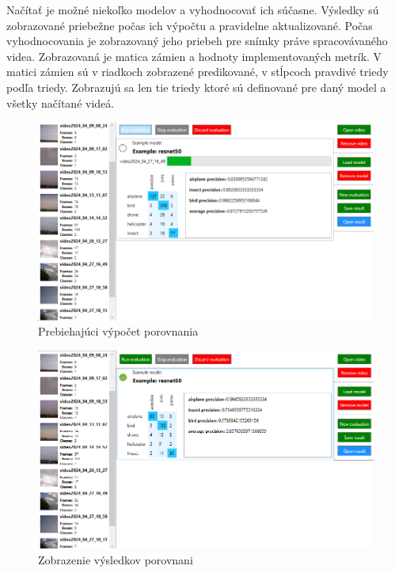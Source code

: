         Načítať je možné niekoľko modelov a vyhodnocovať ich súčasne. Výsledky sú zobrazované priebežne počas ich výpočtu a pravidelne aktualizované. Počas vyhodnocovania je zobrazovaný jeho priebeh pre snímky práve spracovávaného videa. Zobrazovaná je matica zámien a hodnoty implementovaných metrík.
        V matici zámien sú v riadkoch zobrazené predikované, v stĺpcoch pravdivé triedy podľa triedy. Zobrazujú sa len tie triedy ktoré sú definované pre daný model a všetky načítané videá.

        \begin{figure}[H]
            \centering
            \includegraphics[width=.8\textwidth]{obrazky/evaluator/in progress.png}
            \caption{Prebiehajúci výpočet porovnania}
        \end{figure}

        \begin{figure}[H]
            \centering
            \includegraphics[width=.8\textwidth]{obrazky/evaluator/finished.png}
            \caption{Zobrazenie výsledkov porovnani}
        \end{figure}